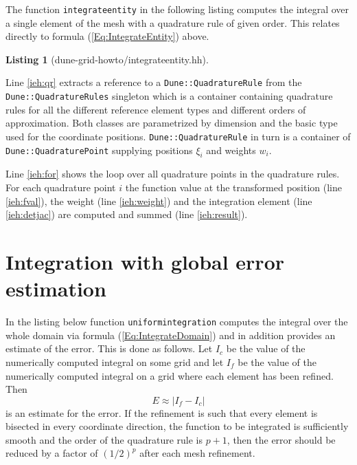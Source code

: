 \documentclass[11pt,a4paper,headinclude,footinclude,DIV16,normalheadings]{scrreprt}
\newtheorem{lst}{Listing}
\begin{document}
The function \lstinline!integrateentity! in the following listing
computes the integral over a single element of the mesh with a
quadrature rule of given order. 
This relates directly to formula (\ref{Eq:IntegrateEntity}) above.

\begin{lst}[dune-grid-howto/integrateentity.hh] \mbox{}


\end{lst}

Line \ref{ieh:qr} extracts a reference to a
\lstinline!Dune::QuadratureRule!  from the
\lstinline!Dune::QuadratureRules! singleton which is a container
containing quadrature rules for all the different reference element
types and different orders of approximation.  Both classes are
parametrized by dimension and the basic type used for the coordinate
positions. \lstinline!Dune::QuadratureRule! in turn is a container of
\lstinline!Dune::QuadraturePoint! supplying positions $\xi_i$ and
weights $w_i$.

Line \ref{ieh:for} shows the loop over all quadrature points in the
quadrature rules. For each quadrature point $i$ the function value at
the transformed position (line \ref{ieh:fval}), the weight (line
\ref{ieh:weight}) and the integration element (line \ref{ieh:detjac})
are computed and summed (line \ref{ieh:result}).

\section{Integration with global error estimation}

In the listing below function \lstinline!uniformintegration!
computes the integral over the whole domain via formula
(\ref{Eq:IntegrateDomain}) and in addition provides an estimate of the
error. This is done as follows. Let $I_c$ be the value of the numerically
computed integral on some grid and let $I_f$ be the value of the
numerically computed integral on a grid where each element has been
refined. Then 
\begin{equation}
\label{Eq:GlobalError}
E \approx |I_f-I_c|
\end{equation}
is an estimate for the error. If
the refinement is such that every element is bisected in every
coordinate direction, the function to be integrated is sufficiently
smooth and the order of the quadrature rule is $p+1$,
then the error should be reduced by a factor of $(1/2)^p$ after
each mesh refinement. 
\end{document}
